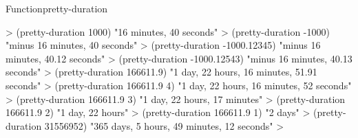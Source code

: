 \documentclass[10pt,twoside,english,pdftex]{article}
\begin{document}
\begin{functiondoc}{Function}{pretty-duration}{%
    }
\fnexamples
%
\W\supp
\begin{example}
  > (pretty-duration 1000)
  "16 minutes, 40 seconds"
  > (pretty-duration -1000)
  "minus 16 minutes, 40 seconds"
  > (pretty-duration -1000.12345)
  "minus 16 minutes, 40.12 seconds"
  > (pretty-duration -1000.12543)
  "minus 16 minutes, 40.13 seconds"\goodpagebreak
  > (pretty-duration 166611.9)
  "1 day, 22 hours, 16 minutes, 51.91 seconds"
  > (pretty-duration 166611.9 4)
  "1 day, 22 hours, 16 minutes, 52 seconds"
  > (pretty-duration 166611.9 3)
  "1 day, 22 hours, 17 minutes"
  > (pretty-duration 166611.9 2)
  "1 day, 22 hours"
  > (pretty-duration 166611.9 1)
  "2 days"\goodpagebreak
  > (pretty-duration 31556952)
  "365 days, 5 hours, 49 minutes, 12 seconds"
  >
\end{example}

\end{functiondoc}

\end{document}
